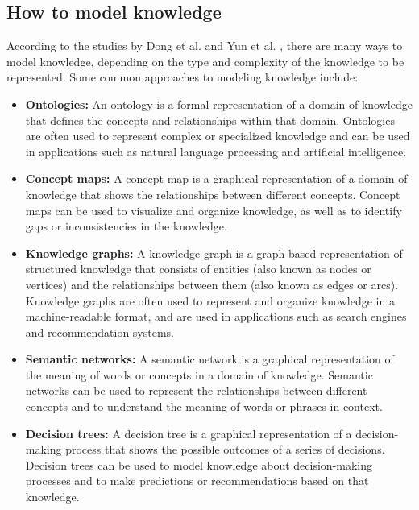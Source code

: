 \subsection{How to model knowledge} \label{how_to_model}
According to the studies by Dong et al. \cite{Dong2022} and Yun et al. \cite{Yun2021}, there are many ways to model knowledge, depending on the type and complexity of the knowledge to be represented. Some common approaches to modeling knowledge include:

\begin{itemize}
    \item \textbf{Ontologies:} An ontology is a formal representation of a domain of knowledge that defines the concepts and relationships within that domain. Ontologies are often used to represent complex or specialized knowledge and can be used in applications such as natural language processing and artificial intelligence.
    \item \textbf{Concept maps:}  A concept map is a graphical representation of a domain of knowledge that shows the relationships between different concepts. Concept maps can be used to visualize and organize knowledge, as well as to identify gaps or inconsistencies in the knowledge.
    \item \textbf{Knowledge graphs:}  A knowledge graph is a graph-based representation of structured knowledge that consists of entities (also known as nodes or vertices) and the relationships between them (also known as edges or arcs). Knowledge graphs are often used to represent and organize knowledge in a machine-readable format, and are used in applications such as search engines and recommendation systems.
    \item \textbf{Semantic networks:}  A semantic network is a graphical representation of the meaning of words or concepts in a domain of knowledge. Semantic networks can be used to represent the relationships between different concepts and to understand the meaning of words or phrases in context.
    \item \textbf{Decision trees:}  A decision tree is a graphical representation of a decision-making process that shows the possible outcomes of a series of decisions. Decision trees can be used to model knowledge about decision-making processes and to make predictions or recommendations based on that knowledge.
\end{itemize}

